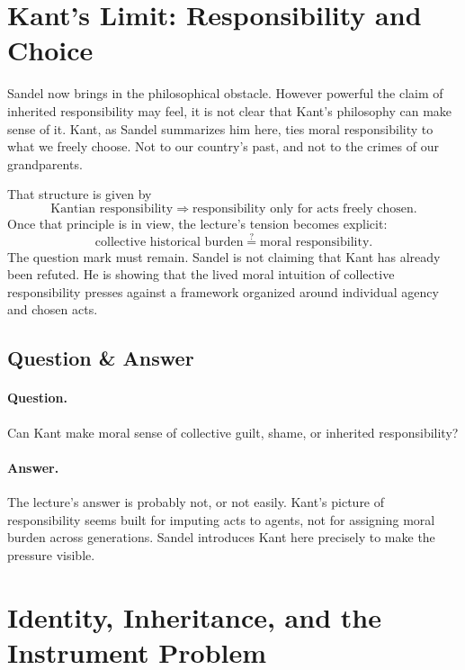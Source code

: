 \section{Kant's Limit: Responsibility and Choice}

Sandel now brings in the philosophical obstacle. However powerful the claim of inherited responsibility may feel, it is not clear that Kant's philosophy can make sense of it. Kant, as Sandel summarizes him here, ties moral responsibility to what we freely choose. Not to our country's past, and not to the crimes of our grandparents.

That structure is given by
\begin{equation}
\text{Kantian responsibility}
\Longrightarrow
\text{responsibility only for acts freely chosen}.
\end{equation}
Once that principle is in view, the lecture's tension becomes explicit:
\begin{equation}
\text{collective historical burden}
\stackrel{?}{=}
\text{moral responsibility}.
\end{equation}
The question mark must remain. Sandel is not claiming that Kant has already been refuted. He is showing that the lived moral intuition of collective responsibility presses against a framework organized around individual agency and chosen acts.

\subsection{Question \& Answer}

\paragraph{Question.} Can Kant make moral sense of collective guilt, shame, or inherited responsibility?

\paragraph{Answer.} The lecture's answer is probably not, or not easily. Kant's picture of responsibility seems built for imputing acts to agents, not for assigning moral burden across generations. Sandel introduces Kant here precisely to make the pressure visible.

\section{Identity, Inheritance, and the Instrument Problem}

